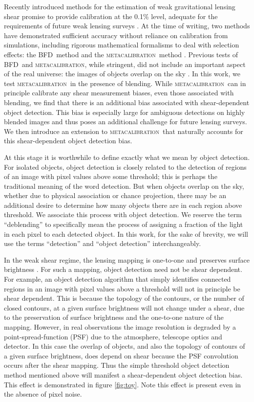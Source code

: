 \documentclass[fleqn,useAMS,usenatbib]{mnras}
\newcommand{\mcal}{\textsc{metacalibration}}
\newcommand{\bfd}{\textsc{BFD}}
\begin{document}
Recently introduced methods for the estimation of weak gravitational lensing
shear promise to provide calibration at the 0.1\% level, adequate for the
requirements of future weak lensing surveys \citep[e.g.,][]{huterer2006}.  At
the time of writing, two methods have demonstrated sufficient accuracy without
reliance on calibration from simulations, including rigorous mathematical
formalisms to deal with selection effects:  the \bfd\ method
\citep{BernBFD2016} and the \mcal\ method \citep{HuffMcal2017,SheldonMcal2017}.
Previous tests of \bfd\ and \mcal, while stringent, did not include an
important aspect of the real universe: the images of objects overlap on the sky
\citep[for discussion of blending effects see, e.g.,][]{DawsonBlending2016}. In
this work, we test \mcal\ in the presence of blending. While \mcal\ can in
principle calibrate any shear measurement biases, even those associated with
blending, we find that there is an additional bias associated with
shear-dependent object detection. This bias is especially large for ambiguous
detections on highly blended images and thus poses an additional challenge for
future lensing surveys. We then introduce an extension to \mcal\ that naturally
accounts for this shear-dependent object detection bias.

At this stage it is worthwhile to define exactly what we mean by object
detection.  For isolated objects, object detection is closely related to the
detection of regions of an image with pixel values above some threshold; this is
perhaps the traditional meaning of the word detection. But when objects overlap
on the sky, whether due to physical association or chance projection, there may
be an additional desire to determine how many objects there are in each region
above threshold. We associate this process with object detection.  We reserve
the term ``deblending'' to specifically mean the process of assigning a
fraction of the light in each pixel to each detected object.  In this work, for
the sake of brevity, we will use the terms ``detection'' and ``object
detection'' interchangeably.

In the weak shear regime, the lensing mapping is one-to-one and preserves
surface brightness \citep{SchneiderBook92}. For such a mapping, object
detection need not be shear dependent. For example, an object detection
algorithm that simply identifies connected regions in an image with pixel
values above a threshold will not in principle be shear dependent.  This is
because the topology of the contours, or the number of closed contours, at a
given surface brightness will not change under a shear, due to the preservation
of surface brightness and the one-to-one nature of the mapping.  However, in
real observations the image resolution is degraded by a point-spread-function
(PSF) due to the atmosphere, telescope optics and detector. In this case the
overlap of objects, and also the topology of contours of a given surface
brightness, does depend on shear because the PSF convolution occurs after the
shear mapping.  Thus the simple threshold object detection method mentioned
above will manifest a shear-dependent object detection bias. This effect is
demonstrated in figure \ref{fig:toy}.  Note this effect is present even in the
absence of pixel noise.
\end{document}
